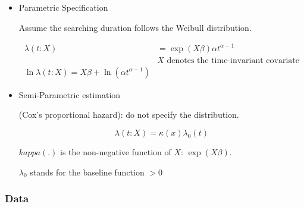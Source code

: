 \documentclass[dvipdfmx, 12pt]{article}
\begin{document}
\begin{itemize}
  \item Parametric Specification

  Assume the searching duration follows the Weibull distribution.

  \begin{align*}
    \lambda(t: X) &= \exp(X \beta) \alpha t^{\alpha - 1} \\
    & X \text{ denotes the time-invariant covariate} \\
    \ln \lambda (t: X) = X \beta + \ln (\alpha t^{\alpha - 1})
  \end{align*}

  \item Semi-Parametric estimation

  (Cox's proportional hazard): do not specify the distribution.

  \[
  \lambda (t: X) = \kappa (x) \lambda_0 (t)
  \]

  $kappa(.)$ is the non-negative function of $X$: $\exp (X \beta)$.

  $\lambda_0$ stands for the baseline function $> 0$
\end{itemize}

\subsubsection{Data}
\end{document}
